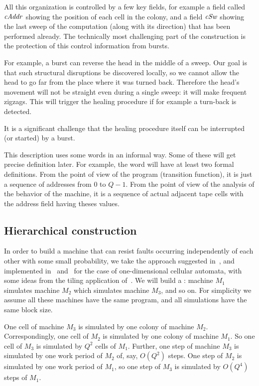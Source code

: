\documentclass[12pt]{memoir}
\newcommand{\fld}[1]{\ensuremath{\textit{#1\/}}}
\newcommand{\Q}{Q}
\newcommand{\cAddr}{\fld{cAddr}}
\newcommand{\cSweep}{\fld{cSw}}
\begin{document}
All this organization is controlled by a few key fields, for example a field
called \( \cAddr \) showing the position of each cell in the colony, and a field
\( \cSweep \) showing the last sweep of the computation (along with its direction)
that has been performed already.
The technically most challenging part of the construction is the protection of this
control information from bursts.

For example, a burst can reverse the head in the middle of a sweep.
Our goal is that such structural disruptions be discovered locally, so
we cannot allow the head to go far from the place where it was turned back.
Therefore the head's movement will not be straight even during a single
sweep: it will make frequent zigzags.
This will trigger the healing procedure if for example a turn-back is detected.

It is a significant challenge that the healing procedure
itself can be interrupted (or started) by a burst.

\begin{remark}
This description uses some words in an informal way.
Some of these will get precise definition later.
For example, the word  will have at least two formal definitions.
From the point of view of the program (transition function), it is just a 
sequence of addresses from \( 0 \) to \( \Q-1 \).
From the point of view of the analysis of the behavior of the machine, it is a sequence of
actual adjacent tape cells with the address field having theses values.
\end{remark}


\subsection{Hierarchical construction}\label{sec:hier}

In order to build a machine that can resist faults 
occurring independently of each other with some small probability,
we take the approach suggested in~\cite{Kurd78},
and implemented in~\cite{Gacs1dim86} and~\cite{GacsSorg01}
for the case of one-dimensional cellular automata, with some ideas
from the tiling application of~\cite{DurandRomashShenTiling12}.
We will build a :
machine \( M_{1} \) simulates machine \( M_{2} \) which 
simulates machine \( M_3 \), and so on.
For simplicity we assume all these machines have the same program,
and all simulations have the same block size.

One cell of machine \( M_3 \) is simulated by one colony of machine \( M_{2} \).
Correspondingly, one cell of \( M_{2} \) is simulated by
one colony of machine \( M_{1} \).
So one cell of \( M_3 \) is simulated by \( \Q^{2} \) cells of \( M_{1} \).
Further, one step of machine \( M_3 \) is simulated by one
work period of \( M_{2} \) of, say, \( O(\Q^{2}) \) steps.
One step of \( M_{2} \) is simulated by one work period of \( M_{1} \),
so one step of \( M_3 \) is simulated by \( O(\Q^{4}) \) steps of \( M_{1} \).
\end{document}
